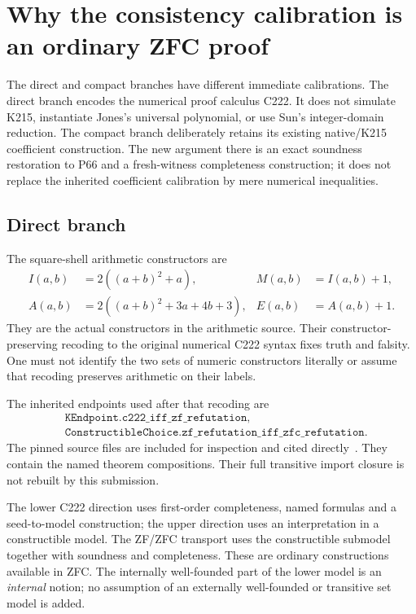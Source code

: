 \documentclass[11pt]{article}
\begin{document}




\section{Why the consistency calibration is an ordinary ZFC proof}
\label{sec:calibration}

The direct and compact branches have different immediate calibrations.
The direct branch encodes the numerical proof calculus C222. It does
not simulate K215, instantiate Jones's universal polynomial, or use
Sun's integer-domain reduction. The compact branch deliberately retains
its existing native/K215 coefficient construction. The new argument
there is an exact soundness restoration to P66 and a fresh-witness
completeness construction; it does not replace the inherited coefficient
calibration by mere numerical inequalities.

\subsection{Direct branch}

The square-shell arithmetic constructors are
\begin{align*}
 I(a,b)&=2((a+b)^2+a),& M(a,b)&=I(a,b)+1,\\
 A(a,b)&=2((a+b)^2+3a+4b+3),&
 E(a,b)&=A(a,b)+1.
\end{align*}
They are the actual constructors in the arithmetic source.
Their constructor-preserving recoding to the original numerical C222
syntax fixes truth and falsity. One must not identify the two sets of
numeric constructors literally or assume that recoding preserves
arithmetic on their labels.

The inherited endpoints used after that recoding are
\begin{align*}
 &\texttt{KEndpoint.c222\_iff\_zf\_refutation},\\
 &\texttt{ConstructibleChoice.zf\_refutation\_iff\_zfc\_refutation}.
\end{align*}
The pinned source files are included for inspection and cited
directly~\cite{kendpoint,choice}. They contain the named theorem
compositions. Their full transitive import closure is not rebuilt by
this submission.

The lower C222 direction uses first-order completeness, named formulas
and a seed-to-model construction; the upper direction uses an
interpretation in a constructible model. The ZF/ZFC transport uses the
constructible submodel together with soundness and completeness. These
are ordinary constructions available in ZFC. The internally well-founded
part of the lower model is an \emph{internal} notion; no assumption of an
externally well-founded or transitive set model is added.
\end{document}
